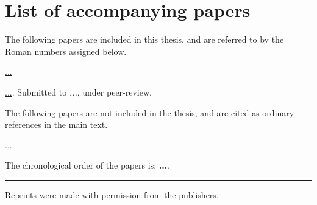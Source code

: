 \tocless\chapter{List of accompanying papers}
\label{ch:papers}

\vspace{-5pt} %

\noindent The following papers are included in this thesis, and are referred to by the Roman numbers assigned below.

\vspace{0.5cm} %

\begin{description}[align=left, labelwidth=0.75cm ,labelindent=0cm]
\setlength\itemsep{0.5cm}
 \item [I]  		\hyperref[PaperI]{...}
 \item [II] 		\hyperref[PaperII]{...}. Submitted to \emph{...}, under peer-review.
\end{description}

\vspace{0.5cm}
\noindent
The following papers are not included in the thesis, and are cited as ordinary references in the main text.
\vspace{0.5cm}

\begin{description}[align=left, labelwidth=0.75cm ,labelindent=0cm]
\setlength\itemsep{0.5cm}
 \item ...
\end{description}
\vspace{0.5cm}
\noindent
The chronological order of the papers is: \textbf{...}.

\noindent
\rule{\linewidth}{0.5mm}

\vspace{2mm}

\noindent
Reprints were made with permission from the publishers.